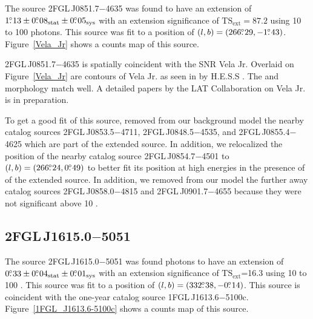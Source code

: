 \documentclass[12pt,preprint]{aastex}
\newcommand{\gev}{\text{GeV}\xspace}
\newcommand{\tev}{\text{TeV}\xspace}
\newcommand{\tsext}{{\ensuremath{\text{TS}_{\text{ext}}}}\xspace}
\newcommand{\sys}{\text{sys}\xspace}
\newcommand{\stat}{\text{stat}\xspace}
\begin{document}

The source 2FGL\,J0851.7$-$4635 was found 
to have an
extension of $1\fdg13\pm0\fdg08_\stat\pm0\fdg05_\sys$ 
with an extension
significance of $\tsext=87.2$
using 10 \gev to 100 \gev photons.  This source was fit to a position of
$(l,b)=(266\mbox{$.\!\!^\circ$}29,-1\mbox{$.\!\!^\circ$}43)$.  Figure~\ref{Vela_Jr} shows a counts
map of this source.

2FGL\,J0851.7$-$4635 is spatially coincident with the SNR Vela Jr.
Overlaid on Figure~\ref{Vela_Jr} are contours of Vela Jr. as seen in
\tev by H.E.S.S \citep{vela_jr_hess}.  The \gev and \tev morphology
match well.  A detailed papers by the LAT Collaboration on Vela Jr. is
in preparation.

To get a good fit of this source, removed from
our background model the nearby catalog
sources 2FGL\,J0853.5$-$4711, 2FGL\,J0848.5$-$4535, and 2FGL\,J0855.4$-$4625
which are part of the extended source.  In addition, we relocalized
the position of the nearby catalog source 2FGL\,J0854.7$-$4501 to
$(l,b)=(266\mbox{$.\!\!^\circ$}24,0\mbox{$.\!\!^\circ$}49)$ to better fit its position at high energies
in the presence of of the extended source.  In addition, we removed from
our model the
further away catalog sources 2FGL\,J0858.0$-$4815 and 2FGL\,J0901.7$-$4655
because they were not significant above 10 \gev.  

\subsection{2FGL\,J1615.0$-$5051}
\label{section_2FGL_J1615.0-5051}


The source 2FGL\,J1615.0$-$5051 was found 
photons to have an extension of $0\fdg33\pm0\fdg04_\stat\pm0\fdg01_\sys$
with an extension significance of \tsext=16.3
using 10 \gev to 100 \gev.  This source
was fit to a position of $(l,b)=(332\mbox{$.\!\!^\circ$}38,-0\mbox{$.\!\!^\circ$}14)$.
This source is coincident with the one-year catalog source
1FGL\,J1613.6$-$5100c. Figure~\ref{1FGL_J1613.6-5100c} shows a counts map
of this source.
\end{document}
